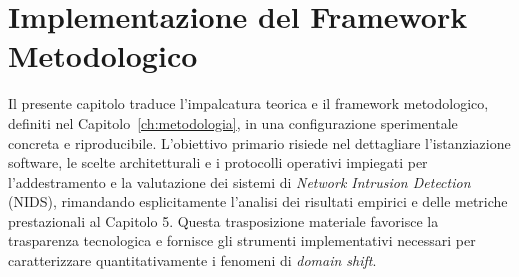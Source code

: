 \chapter{Implementazione del Framework Metodologico}
\label{ch:implementazione}

Il presente capitolo traduce l'impalcatura teorica e il framework metodologico, definiti nel Capitolo~\ref{ch:metodologia}, in una configurazione sperimentale concreta e riproducibile. 
L'obiettivo primario risiede nel dettagliare l'istanziazione software, le scelte architetturali e i protocolli operativi impiegati per l'addestramento e la valutazione dei sistemi di \textit{Network Intrusion Detection} (NIDS), rimandando esplicitamente l'analisi dei risultati empirici e delle metriche prestazionali al Capitolo 5. 
Questa trasposizione materiale favorisce la trasparenza tecnologica e fornisce gli strumenti implementativi necessari per caratterizzare quantitativamente i fenomeni di \textit{domain shift}.

